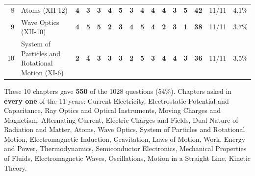\documentclass[10pt,a4paper]{article}
\begin{document}
{\begin{tabularx}{\linewidth}{@{}r>{\raggedright\arraybackslash}X*{11}{c}ccc@{}}
8 & Atoms {\scriptsize(XII-12)} & \textbf{4} & \textbf{3} & \textbf{3} & \textbf{4} & \textbf{5} & \textbf{3} & \textbf{4} & \textbf{4} & \textbf{4} & \textbf{3} & \textbf{5} & \textbf{42} & 11/11 & 4.1\%\\
9 & Wave Optics {\scriptsize(XII-10)} & \textbf{4} & \textbf{5} & \textbf{5} & \textbf{2} & \textbf{3} & \textbf{4} & \textbf{5} & \textbf{4} & \textbf{2} & \textbf{3} & \textbf{1} & \textbf{38} & 11/11 & 3.7\%\\
10 & System of Particles and Rotational Motion {\scriptsize(XI-6)} & \textbf{2} & \textbf{4} & \textbf{3} & \textbf{3} & \textbf{3} & \textbf{2} & \textbf{5} & \textbf{3} & \textbf{4} & \textbf{4} & \textbf{3} & \textbf{36} & 11/11 & 3.5\%\\
\bottomrule\end{tabularx}}\par\smallskip
{\small These 10 chapters gave \textbf{550} of the 1028 questions (54\%).
Chapters asked in \textbf{every one} of the 11 years: Current Electricity, Electrostatic Potential and Capacitance, Ray Optics and Optical Instruments, Moving Charges and Magnetism, Alternating Current, Electric Charges and Fields, Dual Nature of Radiation and Matter, Atoms, Wave Optics, System of Particles and Rotational Motion, Electromagnetic Induction, Gravitation, Laws of Motion, Work, Energy and Power, Thermodynamics, Semiconductor Electronics, Mechanical Properties of Fluids, Electromagnetic Waves, Oscillations, Motion in a Straight Line, Kinetic Theory.}\par\clearpage
\end{document}
